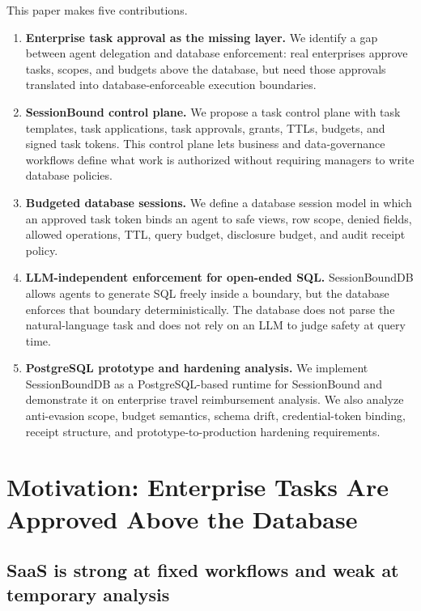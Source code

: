 \documentclass[
]{article}
\begin{document}
This paper makes five contributions.

\begin{enumerate}
\def\labelenumi{\arabic{enumi}.}
\item
  \textbf{Enterprise task approval as the missing layer.} We identify a
  gap between agent delegation and database enforcement: real
  enterprises approve tasks, scopes, and budgets above the database, but
  need those approvals translated into database-enforceable execution
  boundaries.
\item
  \textbf{SessionBound control plane.} We propose a task control plane
  with task templates, task applications, task approvals, grants, TTLs,
  budgets, and signed task tokens. This control plane lets business and
  data-governance workflows define what work is authorized without
  requiring managers to write database policies.
\item
  \textbf{Budgeted database sessions.} We define a database session
  model in which an approved task token binds an agent to safe views,
  row scope, denied fields, allowed operations, TTL, query budget,
  disclosure budget, and audit receipt policy.
\item
  \textbf{LLM-independent enforcement for open-ended SQL.}
  SessionBoundDB allows agents to generate SQL freely inside a boundary,
  but the database enforces that boundary deterministically. The
  database does not parse the natural-language task and does not rely on
  an LLM to judge safety at query time.
\item
  \textbf{PostgreSQL prototype and hardening analysis.} We implement
  SessionBoundDB as a PostgreSQL-based runtime for SessionBound and
  demonstrate it on enterprise travel reimbursement analysis. We also
  analyze anti-evasion scope, budget semantics, schema drift,
  credential-token binding, receipt structure, and
  prototype-to-production hardening requirements.
\end{enumerate}


\hypertarget{motivation-enterprise-tasks-are-approved-above-the-database}{%
\section{Motivation: Enterprise Tasks Are Approved Above the
Database}\label{motivation-enterprise-tasks-are-approved-above-the-database}}

\hypertarget{saas-is-strong-at-fixed-workflows-and-weak-at-temporary-analysis}{%
\subsection{SaaS is strong at fixed workflows and weak at
temporary
analysis}\label{saas-is-strong-at-fixed-workflows-and-weak-at-temporary-analysis}}
\end{document}
